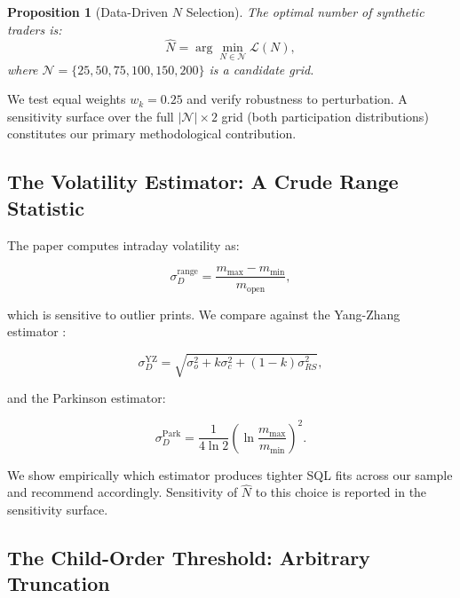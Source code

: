 \documentclass[12pt,a4paper]{article}
\newtheorem{proposition}{Proposition}
\begin{document}
\begin{proposition}[Data-Driven $N$ Selection]
The optimal number of synthetic traders is:
\begin{equation}
  \hat{N} = \arg\min_{N \in \mathcal{N}} \mathcal{L}(N),
  \label{eq:nhat}
\end{equation}
where $\mathcal{N} = \{25, 50, 75, 100, 150, 200\}$ is a candidate grid.
\end{proposition}

We test equal weights $w_k = 0.25$ and verify robustness to perturbation.
A sensitivity surface over the full $|\mathcal{N}| \times 2$ grid (both
participation distributions) constitutes our primary methodological contribution.

\subsection{The Volatility Estimator: A Crude Range Statistic}

The paper computes intraday volatility as:

\begin{equation}
  \sigma_D^{\text{range}} = \frac{m_{\max} - m_{\min}}{m_{\text{open}}},
  \label{eq:range_vol}
\end{equation}

\noindent which is sensitive to outlier prints. We compare against the
Yang-Zhang estimator \citep{yangzhang2000}:

\begin{equation}
  \sigma_D^{\text{YZ}} = \sqrt{\sigma_o^2 + k\sigma_c^2 + (1-k)\sigma_{RS}^2},
  \label{eq:yz_vol}
\end{equation}

\noindent and the Parkinson estimator:

\begin{equation}
  \sigma_D^{\text{Park}} = \frac{1}{4 \ln 2}
    \left(\ln \frac{m_{\max}}{m_{\min}}\right)^2.
  \label{eq:park_vol}
\end{equation}

We show empirically which estimator produces tighter SQL fits across our sample
and recommend accordingly. Sensitivity of $\hat{N}$ to this choice is reported
in the sensitivity surface.

\subsection{The Child-Order Threshold: Arbitrary Truncation}
\end{document}
